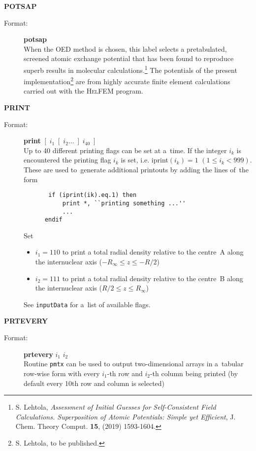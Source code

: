 \documentclass[12pt,a4paper]{article}
\newcommand{\ft}[1]{\texttt{#1}}
\begin{document}
\begin{description}
\item \textbf{POTSAP}
\begin{description}
\item[Format:] \textbf{potsap} \\ When the OED method is chosen, this
  label selects a pretabulated, screened atomic exchange potential
  that has been found to reproduce superb results in molecular
  calculations.\footnote{S. Lehtola, \textsl{Assessment of Initial
      Guesses for Self-Consistent Field Calculations. Superposition of
      Atomic Potentials: Simple yet Efficient}, J. Chem. Theory
    Comput. \textbf{15}, (2019)
    1593-1604. } The potentials of the
  present implementation\footnote{S. Lehtola, to be published.} are
  from highly accurate finite element calculations carried out with
  the \textsc{HelFEM} program.
\end{description}

\item \textbf{PRINT}
\begin{description}
\item[Format:] \textbf{print} $[\; i_1 \; [\;i_2 \ldots \;] \;i_{40}\;]$ \\ Up to 40
  different printing flags can be set at a~time. If the integer $i_k$ is encountered the
  printing flag $i_k$ is set, i.e. iprint$(i_k)=1$ $(1 \leq i_k<999)$. These are used
  to~generate additional printouts by adding the lines of~the form
  \begin{verbatim}
       if (iprint(ik).eq.1) then
           print *, ``printing something ...''
           ...
      endif
    \end{verbatim}

Set
\begin{itemize}
\item $i_1=110$ to print a total radial density relative to the
  centre~A along the internuclear axis ($-R_{\infty}\le z\le -R/2$)

\item $i_2=111$ to print a total radial density relative to the
  centre~B along the internuclear axis ($R/2\le z\le R_{\infty}$)
\end{itemize}
See \ft{inputData} for a~list of available flags.

\end{description}


\item \textbf{PRTEVERY}
\begin{description}
\item[Format:] \textbf{prtevery} $i_1$ $i_2$ \\ Routine \ft{pmtx} can be used to output
  two-dimensional arrays in a~tabular row-wise form with every $i_1$-th row and $i_2$-th
  column being printed (by default every 10th row and column is selected)
\end{description}



\end{description}
\end{document}
